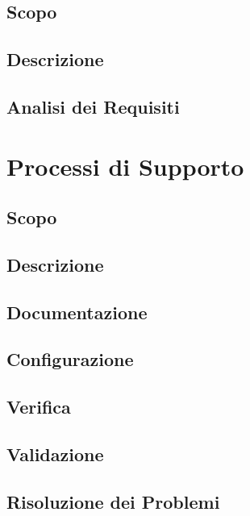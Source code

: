 \documentclass[12pt,a4paper]{article}
\begin{document}
\subsection{Scopo}

\subsection{Descrizione}

\subsection{Analisi dei Requisiti} %

\newpage

\section{Processi di Supporto} %

\subsection{Scopo}

\subsection{Descrizione}

\subsection{Documentazione} %

\subsection{Configurazione} %

\subsection{Verifica} %

\subsection{Validazione} %

\subsection{Risoluzione dei Problemi} %
\end{document}

